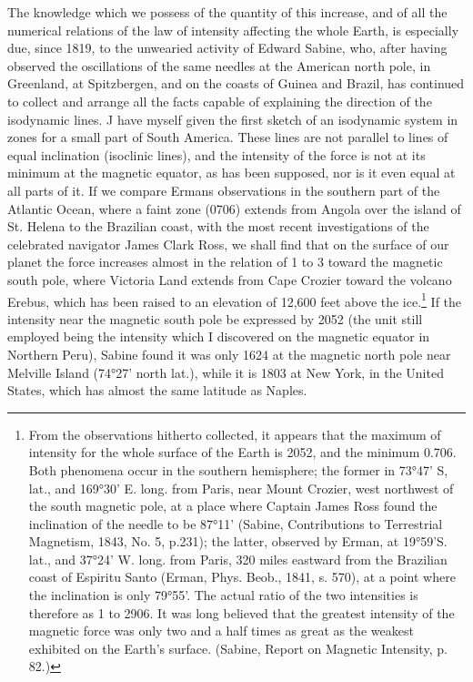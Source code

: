 The knowledge which we possess of the quantity of this increase, and of all the numerical relations of the law of intensity affecting the whole Earth, is especially due, since 1819, to the unwearied activity of Edward Sabine, who, after having observed the oscillations of the same needles at the American north pole, in Greenland, at Spitzbergen, and on the coasts of Guinea and Brazil, has continued to collect and arrange all the facts capable of explaining the direction of the isodynamic lines. J have myself given the first sketch of an isodynamic system in zones for a small part of South America. These lines are not parallel to lines of equal inclination (isoclinic lines), and the intensity of the force is not at its minimum at the magnetic equator, as has been supposed, nor is it even equal at all parts of it. If we compare Ermans observations in the southern part of the Atlantic Ocean, where a faint zone (0706) extends from Angola over the island of St. Helena to the Brazilian coast, with the most recent investigations of the celebrated navigator James Clark Ross, we shall find that on the surface of our planet the force increases almost in the relation of 1 to 3 toward the magnetic south pole, where Victoria Land extends from Cape Crozier toward the volcano Erebus, which has been raised to an elevation of 12,600 feet above the ice.\footnote{From the observations hitherto collected, it appears that the maximum of intensity for the whole surface of the Earth is 2052, and the minimum 0.706. Both phenomena occur in the southern hemisphere; the former in 73°47' S, lat., and 169°30' E. long. from Paris, near Mount Crozier, west northwest of the south magnetic pole, at a place where Captain James Ross found the inclination of the needle to be 87°11' (Sabine, Contributions to Terrestrial Magnetism, 1843, No. 5, p.231); the latter, observed by Erman, at 19°59'S. lat., and 37°24' W. long. from Paris, 320 miles eastward from the Brazilian coast of Espiritu Santo (Erman, Phys. Beob., 1841, s. 570), at a point where the inclination is only 79°55'. The actual ratio of the two intensities is therefore as 1 to 2906. It was long believed that the greatest intensity of the magnetic force was only two and a half times as great as the weakest exhibited on the Earth's surface. (Sabine, Report on Magnetic Intensity, p. 82.)} If the intensity near the magnetic south pole be expressed by 2052 (the unit still employed being the intensity which I discovered on the magnetic equator in Northern Peru), Sabine found it was only 1624 at the magnetic north pole near Melville Island (74°27' north lat.), while it is 1803 at New York, in the United States, which has almost the same latitude as Naples.

